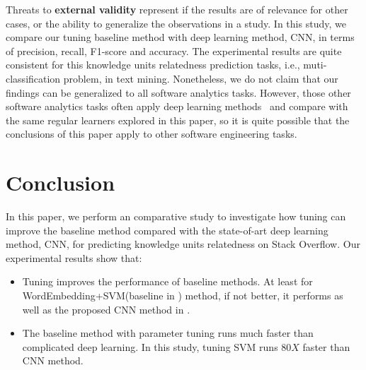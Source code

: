 \documentclass[sigconf,review, anonymous]{acmart}
\theoremstyle{break}
\newcommand{\bi}{\begin{itemize}[leftmargin=0.4cm]}
\newcommand{\ei}{\end{itemize}}
\begin{document}
 
 
 Threats to \textbf{external validity} represent if the results are of relevance for
 other cases, or the ability to generalize the observations in a study. In this study,
 we compare our tuning baseline method with deep learning method, CNN, in terms of
 precision, recall, F1-score and accuracy. The experimental results are quite consistent
 for this knowledge units relatedness prediction tasks, i.e.,  muti-classification problem, in text mining. 
 Nonetheless, we do not claim that our findings can be generalized to all software analytics tasks. 
 However, those other software analytics tasks often apply deep learning
 methods~\cite{choetkiertikul2016deep, wang2016automatically} and compare with
 the same regular learners explored in this paper, so it is quite possible that
 the conclusions of this paper apply to other software engineering tasks.
 
 


\section{Conclusion}

In this paper, we perform an comparative study to investigate
how tuning can improve the baseline method compared with
the state-of-art deep learning method, CNN, for predicting
knowledge units relatedness on Stack Overflow. Our experimental
results show that:

\bi
\item Tuning improves the performance of baseline methods. 
At least for WordEmbedding+SVM(baseline in \cite{xu2016predicting}) method, if not better,
it performs as well as the proposed CNN method in \cite{xu2016predicting}.
\item The baseline method with parameter tuning runs much faster than complicated deep learning.
In this study, tuning SVM runs $80X$ faster than CNN method.
\ei


\end{document}

